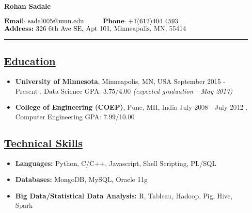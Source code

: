 \documentclass[10pt]{article}
\begin{document}


\begin{raggedleft}
{\bfseries {\huge Rohan Sadale}}
\end{raggedleft}
\hfill
\hfill
\begin{raggedright}
$^{\text{{\bfseries {\normalsize Email}}: {\normalsize sadal005@umn.edu}}{\text{\hspace{28pt}{\bfseries {\normalsize Phone}}: {\normalsize +1(612)404 4593}}}}_{\text{\vspace{10pt}{\bfseries {\normalsize Address:}} {\normalsize 326 6th Ave SE, Apt 101, Minneapolis, MN, 55414}}}$
\end{raggedright}
\vspace{4pt}

\hrule
\vspace{-0.2cm}
\subsection*{\underline{Education}}
\begin{itemize}[leftmargin=*]
\item[] {\bfseries University of Minnesota}, Minneapolis, MN, USA \hfill September 2015 - Present
, Data Science \hspace{0.2in} GPA: 3.75/4.00  \hfill {\sl (expected graduation - May 2017)}
\vspace{-0.1cm}
\item[] {\bfseries College of Engineering (COEP)}, Pune, MH, India \hfill July 2008 - July 2012  
, Computer Engineering	 \hspace{0.2in} GPA: 7.99/10.00
\end{itemize}

\subsection*{\underline{Technical Skills}}
\begin{itemize}[leftmargin=*]
 \item[]  \textbf{Languages:}  Python, C/C++, Javascript, Shell Scripting, PL/SQL
 \vspace{-0.25cm}
 \item[]   \textbf{Databases:}  MongoDB, MySQL, Oracle 11g
  \vspace{-0.25cm}
 \item[]   \textbf{Big Data/Statistical Data Analysis:}   R, Tableau, Hadoop, Pig, Hive, Spark
\end{itemize}
\end{document}
